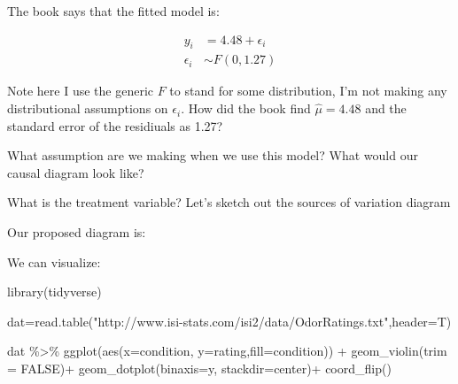 \documentclass[
]{article}
\newenvironment{Shaded}{\begin{snugshade}}{\end{snugshade}}
\newcommand{\AttributeTok}[1]{\textcolor[rgb]{0.77,0.63,0.00}{#1}}
\newcommand{\ConstantTok}[1]{\textcolor[rgb]{0.00,0.00,0.00}{#1}}
\newcommand{\FunctionTok}[1]{\textcolor[rgb]{0.00,0.00,0.00}{#1}}
\newcommand{\NormalTok}[1]{#1}
\newcommand{\OtherTok}[1]{\textcolor[rgb]{0.56,0.35,0.01}{#1}}
\newcommand{\SpecialCharTok}[1]{\textcolor[rgb]{0.00,0.00,0.00}{#1}}
\newcommand{\StringTok}[1]{\textcolor[rgb]{0.31,0.60,0.02}{#1}}
\begin{document}
\vspace{.5in}

The book says that the fitted model is:

\begin{align*}
y_i &= 4.48 + \epsilon_i\\
\epsilon_i & \sim F(0,1.27)
\end{align*}

Note here I use the generic \(F\) to stand for some distribution, I'm
not making any distributional assumptions on \(\epsilon_i\). How did the
book find \(\hat{\mu}=4.48\) and the standard error of the residiuals as
1.27?

\vspace{1.5in}

What assumption are we making when we use this model? What would our
causal diagram look like?

\vspace{.5in}

What is the treatment variable? Let's sketch out the sources of
variation diagram

\vspace{1.4in}

Our proposed diagram is:

\vspace{1.in}

We can visualize:

\begin{Shaded}
\begin{Highlighting}[]
\FunctionTok{library}\NormalTok{(tidyverse)}

\NormalTok{dat}\OtherTok{=}\FunctionTok{read.table}\NormalTok{(}\StringTok{"http://www.isi{-}stats.com/isi2/data/OdorRatings.txt"}\NormalTok{,}\AttributeTok{header=}\NormalTok{T)}

\NormalTok{dat }\SpecialCharTok{\%\textgreater{}\%} \FunctionTok{ggplot}\NormalTok{(}\FunctionTok{aes}\NormalTok{(}\AttributeTok{x=}\NormalTok{condition, }\AttributeTok{y=}\NormalTok{rating,}\AttributeTok{fill=}\NormalTok{condition)) }\SpecialCharTok{+} 
  \FunctionTok{geom\_violin}\NormalTok{(}\AttributeTok{trim =} \ConstantTok{FALSE}\NormalTok{)}\SpecialCharTok{+}
  \FunctionTok{geom\_dotplot}\NormalTok{(}\AttributeTok{binaxis=}\StringTok{\textquotesingle{}y\textquotesingle{}}\NormalTok{, }\AttributeTok{stackdir=}\StringTok{\textquotesingle{}center\textquotesingle{}}\NormalTok{)}\SpecialCharTok{+}
  \FunctionTok{coord\_flip}\NormalTok{()}
\end{Highlighting}
\end{Shaded}
\end{document}
